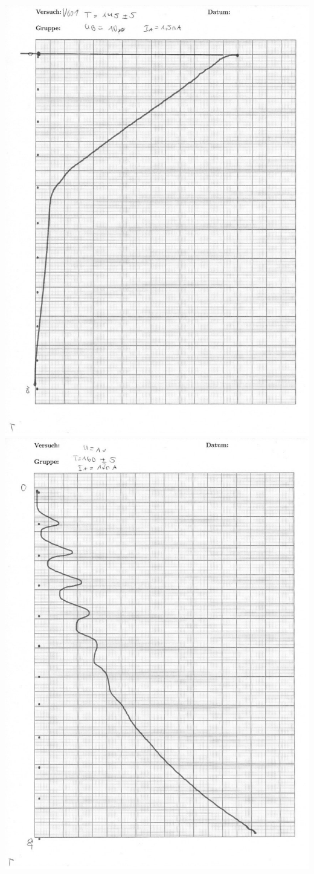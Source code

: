 \includegraphics[width=0.9\linewidth]{content/messung/anhang/2.jpg}
\vfill\null
\newpage
\null\vfill
\includegraphics[width=0.9\linewidth]{content/messung/anhang/3a.jpg}
